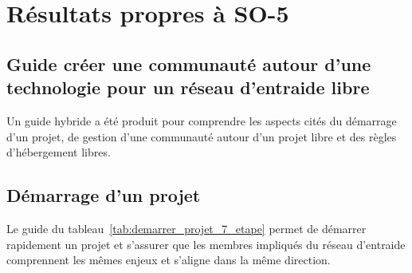 \section{Résultats propres à SO-5}

\subsection{Guide créer une communauté autour d’une technologie pour un réseau d’entraide libre}

Un guide hybride a été produit pour comprendre les aspects cités du démarrage d’un projet, de gestion d’une communauté autour d’un projet libre et des règles d'hébergement libres.

\subsection{Démarrage d’un projet}

Le guide du tableau~\ref{tab:demarrer_projet_7_etape} permet de démarrer rapidement un projet et s'assurer que les membres impliqués du réseau d'entraide comprennent les mêmes enjeux et s'aligne dans la même direction.



